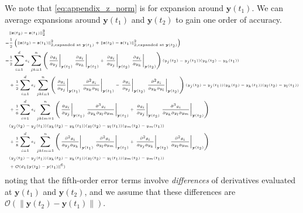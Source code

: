 We note that \eqref{eq:appendix_z_norm} is for expansion around $\mathbf{y}(t_1)$.
%
We can average expansions around $\mathbf{y}(t_1)$ and $\mathbf{y}(t_2)$ to gain one order of accuracy.
%
\begin{equation} \label{eq:mahalanobis_taylor_explansion}
\tiny
\begin{aligned}
& \|\mathbf{z}(t_2) - \mathbf{z}(t_1)\|_2^2 \\
=& \frac{1}{2} \left( \|\mathbf{z}(t_2) - \mathbf{z}(t_1)\|_{2, \text{expanded at } \mathbf{y}(t_1)}^2  + \|\mathbf{z}(t_2) - \mathbf{z}(t_1)\|_{2, \text{expanded at } \mathbf{y}(t_2)}^2 \right) \\
=&
\frac{1}{2} \sum_{i=1}^d e_i \sum_{jk=1}^n \left( \left. \frac{\partial g_i}{\partial y_j} \right|_{\mathbf{y}(t_1)} \left. \frac{\partial g_i}{\partial y_k} \right|_{\mathbf{y}(t_1)} + \left. \frac{\partial g_i}{\partial y_j} \right|_{\mathbf{y}(t_2)} \left. \frac{\partial g_i}{\partial y_k} \right|_{\mathbf{y}(t_2)} \right) (y_j(t_2)-y_j(t_1)) (y_k(t_2)-y_k(t_1)) \\
&+ \frac{1}{2} \sum_{i=1}^d e_i \sum_{jkl=1}^n \left( \left. \frac{\partial g_i}{\partial y_j} \right|_{\mathbf{y}(t_1)} \left. \frac{\partial^2 g_i}{\partial y_k \partial y_l} \right|_{\mathbf{y}(t_1)} - \left. \frac{\partial g_i}{\partial y_j} \right|_{\mathbf{y}(t_2)} \left. \frac{\partial^2 g_i}{\partial y_k \partial y_l} \right|_{\mathbf{y}(t_2)} \right) (y_j(t_2)-y_j(t_1))  (y_k(t_2)-y_k(t_1)) (y_l(t_2)-y_l(t_1)) \\
&+ \frac{1}{6} \sum_{i=1}^d e_i \sum_{jklm=1}^n \left( \left. \frac{\partial g_i}{\partial y_j} \right|_{\mathbf{y}(t_1)} \left. \frac{\partial^3 g_i}{ \partial y_k \partial y_l \partial y_m} \right|_{\mathbf{y}(t_1)} + \left. \frac{\partial g_i}{\partial y_j} \right|_{\mathbf{y}(t_2)} \left. \frac{\partial^3 g_i}{ \partial y_k \partial y_l \partial y_m} \right|_{\mathbf{y}(t_2)} \right)
\\ &(y_j(t_2)-y_j(t_1)) (y_k(t_2)-y_k(t_1)) (y_l(t_2)-y_l(t_1))(y_m(t_2)-y_m(t_1)) \\
&+ \frac{1}{8} \sum_{i=1}^d e_i \sum_{jklm=1}^n \left( \left. \frac{\partial^2 g_i}{\partial y_j \partial y_k} \right|_{\mathbf{y}(t_1)} \left. \frac{\partial^2 g_i}{\partial y_l \partial y_m} \right|_{\mathbf{y}(t_1)} + \left. \frac{\partial^2 g_i}{\partial y_j \partial y_k} \right|_{\mathbf{y}(t_2)} \left. \frac{\partial^2 g_i}{\partial y_l \partial y_m} \right|_{\mathbf{y}(t_2)} \right)
\\ &(y_j(t_2)-y_j(t_1)) (y_k(t_2)-y_k(t_1)) (y_l(t_2)-y_l(t_1)) (y_m(t_2)-y_m(t_1)) \\
&+ \mathcal{O}({d_1} \|\mathbf{y}(t_2) - \mathbf{y}(t_1) \|^6)
\end{aligned}
\end{equation}
%
noting that the fifth-order error terms involve {\em differences} of derivatives evaluated at $\mathbf{y}(t_1)$ and $\mathbf{y}(t_2)$, and we assume that these differences are $\mathcal{O} (\| \mathbf{y}(t_2) - \mathbf{y}(t_1) \|)$.

